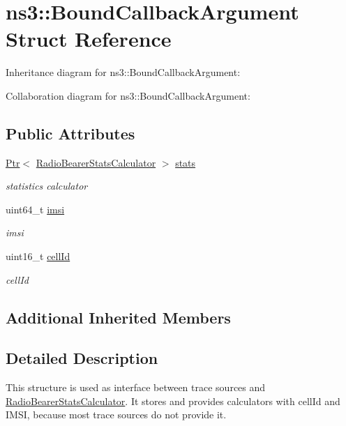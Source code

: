 \hypertarget{structns3_1_1BoundCallbackArgument}{}\section{ns3\+:\+:Bound\+Callback\+Argument Struct Reference}
\label{structns3_1_1BoundCallbackArgument}


Inheritance diagram for ns3\+:\+:Bound\+Callback\+Argument\+:


Collaboration diagram for ns3\+:\+:Bound\+Callback\+Argument\+:
\subsection*{Public Attributes}
\begin{DoxyCompactItemize}
\item 
\hyperlink{classns3_1_1Ptr}{Ptr}$<$ \hyperlink{classns3_1_1RadioBearerStatsCalculator}{Radio\+Bearer\+Stats\+Calculator} $>$ \hyperlink{structns3_1_1BoundCallbackArgument_a1647af8739b3d6cd51867020fdcefa6e}{stats}
\begin{DoxyCompactList}\small\item\em statistics calculator \end{DoxyCompactList}\item 
uint64\+\_\+t \hyperlink{structns3_1_1BoundCallbackArgument_a3fff4d2bee5073074e52e6f819ba80e0}{imsi}
\begin{DoxyCompactList}\small\item\em imsi \end{DoxyCompactList}\item 
uint16\+\_\+t \hyperlink{structns3_1_1BoundCallbackArgument_a178da727e2c7b1222b361395d573e61d}{cell\+Id}
\begin{DoxyCompactList}\small\item\em cell\+Id \end{DoxyCompactList}\end{DoxyCompactItemize}
\subsection*{Additional Inherited Members}


\subsection{Detailed Description}
This structure is used as interface between trace sources and \hyperlink{classns3_1_1RadioBearerStatsCalculator}{Radio\+Bearer\+Stats\+Calculator}. It stores and provides calculators with cell\+Id and I\+M\+SI, because most trace sources do not provide it. 

